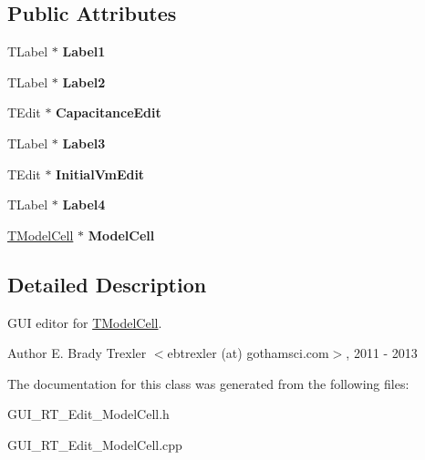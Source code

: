 \subsection*{Public Attributes}
\begin{DoxyCompactItemize}
\item 
\hypertarget{class_t_model_cell_form_a7d221872898b803eb8a5aa4ecb815a40}{T\+Label $\ast$ {\bfseries Label1}}\label{class_t_model_cell_form_a7d221872898b803eb8a5aa4ecb815a40}

\item 
\hypertarget{class_t_model_cell_form_a8c09f791520b94540028fb52a6508cd3}{T\+Label $\ast$ {\bfseries Label2}}\label{class_t_model_cell_form_a8c09f791520b94540028fb52a6508cd3}

\item 
\hypertarget{class_t_model_cell_form_a066f5256e98efe16013f2fb49c365e92}{T\+Edit $\ast$ {\bfseries Capacitance\+Edit}}\label{class_t_model_cell_form_a066f5256e98efe16013f2fb49c365e92}

\item 
\hypertarget{class_t_model_cell_form_a73ba468f4aac61eb23832b0916632eef}{T\+Label $\ast$ {\bfseries Label3}}\label{class_t_model_cell_form_a73ba468f4aac61eb23832b0916632eef}

\item 
\hypertarget{class_t_model_cell_form_af64cc01398fdad784c2a2506fc8ad87f}{T\+Edit $\ast$ {\bfseries Initial\+Vm\+Edit}}\label{class_t_model_cell_form_af64cc01398fdad784c2a2506fc8ad87f}

\item 
\hypertarget{class_t_model_cell_form_a15498a327c0a22d3596b497189987070}{T\+Label $\ast$ {\bfseries Label4}}\label{class_t_model_cell_form_a15498a327c0a22d3596b497189987070}

\item 
\hypertarget{class_t_model_cell_form_ac696daa160db91afdea1de76a3e5057a}{\hyperlink{class_t_model_cell}{T\+Model\+Cell} $\ast$ {\bfseries Model\+Cell}}\label{class_t_model_cell_form_ac696daa160db91afdea1de76a3e5057a}

\end{DoxyCompactItemize}


\subsection{Detailed Description}
G\+U\+I editor for \hyperlink{class_t_model_cell}{T\+Model\+Cell}. 

\begin{DoxyAuthor}{Author}
E. Brady Trexler $<$ebtrexler (at) gothamsci.\+com$>$, 2011 -\/ 2013 
\end{DoxyAuthor}


The documentation for this class was generated from the following files\+:\begin{DoxyCompactItemize}
\item 
G\+U\+I\+\_\+\+R\+T\+\_\+\+Edit\+\_\+\+Model\+Cell.\+h\item 
G\+U\+I\+\_\+\+R\+T\+\_\+\+Edit\+\_\+\+Model\+Cell.\+cpp\end{DoxyCompactItemize}
